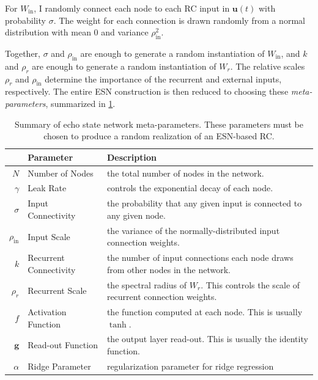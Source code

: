 For $W_\text{in}$, I randomly connect each node to each RC input in
$\bm{u}(t)$ with probability $\sigma$. The weight for each connection
is drawn randomly from a normal distribution with mean $0$ and
variance $\rho_\text{in}^2$.

Together, $\sigma$ and $\rho_\text{in}$ are enough to generate a
random instantiation of $W_\text{in}$, and $k$ and $\rho_r$ are enough
to generate a random instantiation of $W_r$. The relative scales
$\rho_r$ and $\rho_\text{in}$ determine the importance of the
recurrent and external inputs, respectively. The entire ESN construction
is then reduced to choosing these \emph{meta-parameters}, summarized in
\cref{tab:esn-metaparameters}.

\begin{table}
  \caption{Summary of echo state network meta-parameters. These
    parameters must be chosen to produce a random realization of an
    ESN-based RC.}
  \begin{tabularx}{\linewidth}{rlX}
    & Parameter & Description \\
    \hline
    \rule{0pt}{4ex}
    $N$ & Number of Nodes & the total number of nodes in the network. \\
    \rule{0pt}{4ex}
    $\gamma$ & Leak Rate & controls the exponential decay of each node. \\
    \rule{0pt}{4ex}
    $\sigma$ & Input Connectivity & the probability that any given input is connected to any given node. \\
    \rule{0pt}{4ex}
    $\rho_\text{in}$ & Input Scale & the variance of the normally-distributed input connection weights. \\
    \rule{0pt}{4ex}
    $k$ & Recurrent Connectivity & the number of input connections each node draws from other nodes in the network. \\
    \rule{0pt}{4ex}
    $\rho_r$ & Recurrent Scale & the spectral radius of $W_r$. This controls the scale of recurrent connection weights. \\
    \rule{0pt}{4ex}
    $f$ & Activation Function & the function computed at each node. This is usually $\tanh$. \\
    \rule{0pt}{4ex}
    $\bm{g}$ & Read-out Function & the output layer read-out. This is usually the identity function. \\
    \rule{0pt}{4ex}
    $\alpha$ & Ridge Parameter & regularization parameter for ridge regression \\
  \end{tabularx}
  \label{tab:esn-metaparameters}
\end{table}


